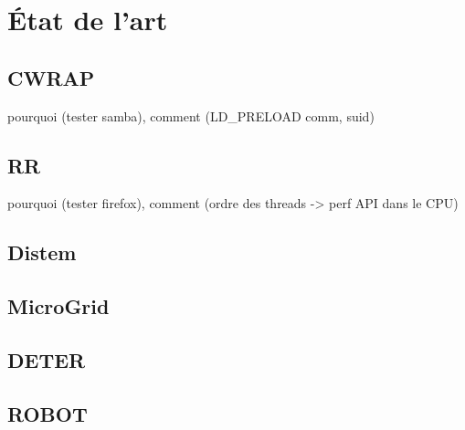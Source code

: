 \section{État de l'art}
\subsection{CWRAP}
 pourquoi (tester samba), comment (LD\_PRELOAD comm, suid)

\subsection{RR}
 pourquoi (tester firefox), comment (ordre des threads -> perf API dans le CPU)
\subsection{Distem}
\subsection{MicroGrid}
\subsection{DETER}
\subsection{ROBOT}
